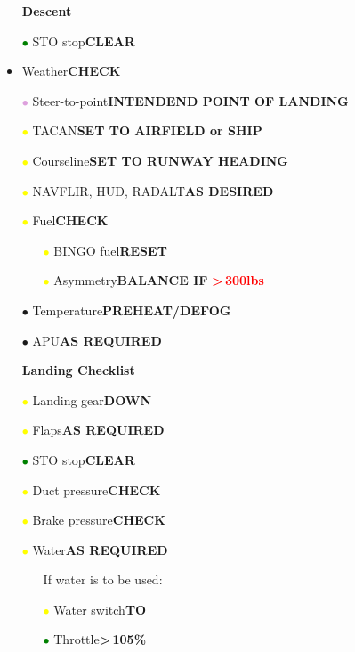 \documentclass[a4paper,12pt,dvipsnames]{letter}
\newcommand{\button}[1]{\textbf{#1}}
\newcommand{\warn}[1]{\textcolor{Red}{\textbf{#1}}}
\newcommand{\bi}{\textcolor{ProcessBlue}{$\bullet$\;}}
\newcommand{\gi}{\textcolor{Green}{$\bullet$\;}}
\newcommand{\yi}{\textcolor{Yellow}{$\bullet$\;}}
\newcommand{\vi}{\textcolor{Plum}{$\bullet$\;}}
\begin{document}
{\begin{itemize}
\begin{itemize}
\end{itemize}
\end{itemize}
\newpage
\begin{itemize}
\item[] {\LARGE\textbf{Descent}}
\item[\gi] STO stop\dotfill\button{CLEAR}
\item Weather\dotfill\button{CHECK}
\item[\vi] Steer-to-point\dotfill\button{INTENDEND POINT OF LANDING}
\item[\yi] TACAN\dotfill\button{SET TO AIRFIELD or SHIP}
\item[\yi] Courseline\dotfill\button{SET TO RUNWAY HEADING}
\item[\yi] NAVFLIR, HUD, RADALT\dotfill\button{AS DESIRED}
\item[\yi] Fuel\dotfill\button{CHECK}
\begin{itemize}
 \item[\yi] BINGO fuel\dotfill\button{RESET}
 \item[\yi] Asymmetry\dotfill\button{BALANCE IF }\warn{>\,300\;lbs}
\end{itemize}
\item[\bi] Temperature\dotfill\button{PREHEAT/DEFOG}
\item[\bi] APU\dotfill\button{AS REQUIRED}
\end{itemize}
\vspace{1em}
\begin{itemize}
\item[] {\LARGE\textbf{Landing Checklist}}
\item[\yi] Landing gear\dotfill\button{DOWN}
\item[\yi] Flaps\dotfill\button{AS REQUIRED}
\item[\gi] STO stop\dotfill\button{CLEAR}
\item[\yi] Duct pressure\dotfill\button{CHECK}
\item[\yi] Brake pressure\dotfill\button{CHECK}
\item[\yi] Water\dotfill\button{AS REQUIRED}
\begin{itemize}
 \item[] If water is to be used:
 \item[\yi] Water switch\dotfill\button{TO}
 \item[\gi] Throttle\dotfill\button{>\,105\%}

\end{itemize}
\end{itemize}}
\end{document}
